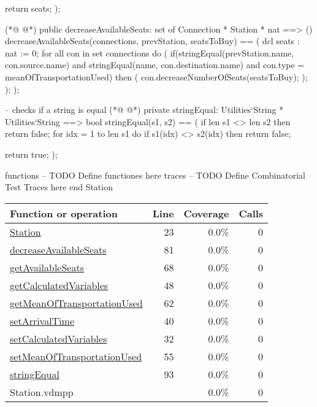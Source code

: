 \begin{vdmpp}[breaklines=true]
  return seats;
 );
 
(*@
\label{decreaseAvailableSeats:81}
@*)
 public decreaseAvailableSeats: set of Connection * Station * nat ==> ()
 decreaseAvailableSeats(connections, prevStation, seatsToBuy) ==
 (
  dcl seats : nat := 0;
  for all con in set connections do (
   if(stringEqual(prevStation.name, con.source.name) and stringEqual(name, con.destination.name) and con.type = meanOfTransportationUsed) then (
    con.decreaseNumberOfSeats(seatsToBuy);
   );
  );
 );
 
 -- checks if a string is equal
(*@
\label{stringEqual:93}
@*)
 private stringEqual: Utilities`String * Utilities`String ==> bool
 stringEqual(s1, s2) ==
 (
  if len s1 <> len s2 then
   return false;
  for idx = 1 to len s1 do
   if s1(idx) <> s2(idx) then return false;
  
  return true;
 );

 
functions
-- TODO Define functiones here
traces
-- TODO Define Combinatorial Test Traces here
end Station
\end{vdmpp}
\bigskip
\begin{longtable}{|l|r|r|r|}
\hline
Function or operation & Line & Coverage & Calls \\
\hline
\hline
\hyperref[Station:23]{Station} & 23&0.0\% & 0 \\
\hline
\hyperref[decreaseAvailableSeats:81]{decreaseAvailableSeats} & 81&0.0\% & 0 \\
\hline
\hyperref[getAvailableSeats:68]{getAvailableSeats} & 68&0.0\% & 0 \\
\hline
\hyperref[getCalculatedVariables:48]{getCalculatedVariables} & 48&0.0\% & 0 \\
\hline
\hyperref[getMeanOfTransportationUsed:62]{getMeanOfTransportationUsed} & 62&0.0\% & 0 \\
\hline
\hyperref[setArrivalTime:40]{setArrivalTime} & 40&0.0\% & 0 \\
\hline
\hyperref[setCalculatedVariables:32]{setCalculatedVariables} & 32&0.0\% & 0 \\
\hline
\hyperref[setMeanOfTransportationUsed:55]{setMeanOfTransportationUsed} & 55&0.0\% & 0 \\
\hline
\hyperref[stringEqual:93]{stringEqual} & 93&0.0\% & 0 \\
\hline
\hline
Station.vdmpp & & 0.0\% & 0 \\
\hline
\end{longtable}

